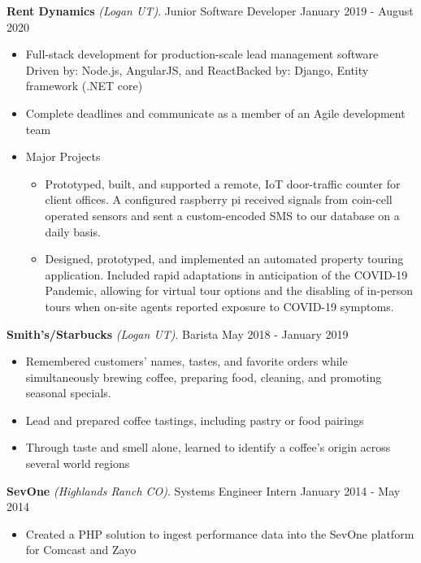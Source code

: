 \documentclass[letterpaper,11pt]{article}
\begin{document}
\textbf{Rent Dynamics} \textit{(Logan UT)}. Junior Software Developer \hfill January 2019 - August 2020
\begin{itemize}[noitemsep,topsep=0pt]
	\item Full-stack development for production-scale lead management software\\ Driven by: Node.js, AngularJS, and React\qquad\quad Backed by: Django, Entity framework (.NET core)
	\item Complete deadlines and communicate as a member of an Agile development team
	\item Major Projects \begin{itemize}[noitemsep, topsep=0pt]
		\item Prototyped, built, and supported a remote, IoT door-traffic counter for client offices. A configured raspberry pi received signals from coin-cell operated sensors and sent a custom-encoded SMS to our database on a daily basis.
		\item Designed, prototyped, and implemented an automated property touring application. Included rapid adaptations in anticipation of the COVID-19 Pandemic, allowing for virtual tour options and the disabling of in-person tours when on-site agents reported exposure to COVID-19 symptoms.
	\end{itemize}
\end{itemize}

\clearpage
\textbf{Smith's/Starbucks} \textit{(Logan UT)}. Barista \hfill May 2018 - January 2019
\begin{itemize}[noitemsep,topsep=0pt]
	\item Remembered customers' names, tastes, and favorite orders while simultaneously brewing coffee, preparing food, cleaning, and promoting seasonal specials.
	\item Lead and prepared coffee tastings, including pastry or food pairings
	\item Through taste and smell alone, learned to identify a coffee's origin across several world regions\\

\end{itemize}

\textbf{SevOne} \textit{(Highlands Ranch CO)}. Systems Engineer Intern \hfill January 2014 - May 2014
\begin{itemize}[noitemsep,topsep=0pt]
	\item Created a PHP solution to ingest performance data into the SevOne platform for Comcast and Zayo\\
\end{itemize}
\end{document}

